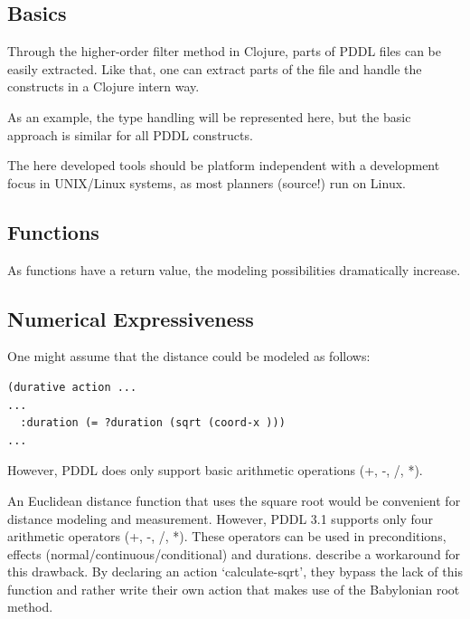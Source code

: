 \documentclass[11pt]{report}
\begin{document}
\subsection{Basics}
\label{sec-4-3-1}
Through the higher-order filter method in Clojure, parts of PDDL files
can be easily extracted. Like that, one can extract parts of the file
and handle the constructs in a Clojure intern way.

As an example, the type handling will be represented here, but the
basic approach is similar for all PDDL constructs.

The here developed tools should be platform independent with a
development focus in UNIX/Linux systems, as most planners (source!)
run on Linux.
\subsection{Functions}
\label{sec-4-3-2}
As functions have a return value, the modeling possibilities
dramatically increase.

\subsection{Numerical Expressiveness}
\label{sec-4-3-3}
One might assume that the distance could be modeled as follows:

\begin{verbatim}
(durative action ...
...
  :duration (= ?duration (sqrt (coord-x )))
...
\end{verbatim}

However, PDDL does only support basic arithmetic operations (+, -, /, *).

An Euclidean distance function that uses the square root would be
convenient for distance modeling and measurement. However, PDDL 3.1
supports only four arithmetic operators (+, -, /, *). These
operators can be used in preconditions, effects
(normal/continuous/conditional) and durations.
\textcite{parkinson2012increasing} describe a workaround for this
drawback. By declaring an action `calculate-sqrt', they bypass the
lack of this function and rather write their own action that makes use
of the Babylonian root method.
\end{document}
